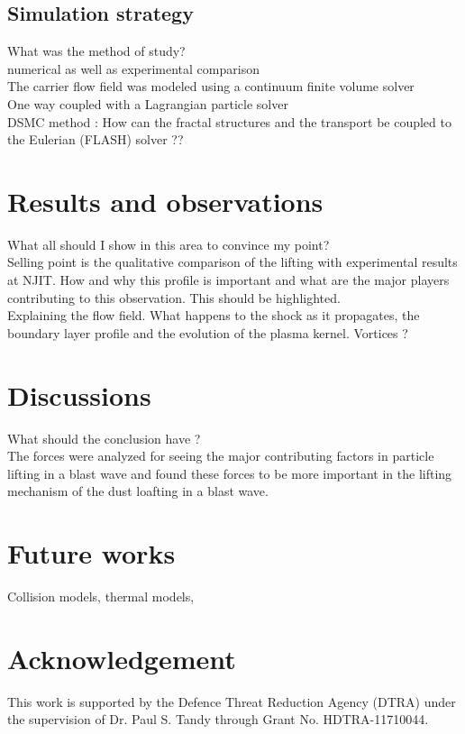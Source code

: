 \documentclass[12pt]{aiaa-tc}
\begin{document}
\subsection{Simulation strategy}
What was the method of study?\\
numerical as well as experimental comparison\\
The carrier flow field was modeled using a continuum finite volume solver\\
One way coupled with a Lagrangian particle solver\\

DSMC method : How can the fractal structures and the transport be coupled to the Eulerian (FLASH) solver ??\\


\newpage
\section{Results and observations}
What all should I show in this area to convince my point?\\
Selling point is the qualitative comparison of the lifting with experimental results at NJIT. How and why this profile is important and what are the major players contributing to this observation. This should be highlighted.\\

Explaining the flow field.
What happens to the shock as it propagates, the boundary layer profile and the evolution of the plasma kernel. Vortices ?


\newpage
\section{Discussions}
What should the conclusion have ?\\
The forces were analyzed for seeing the major contributing factors in particle lifting in a blast wave and found these forces to be more important in the lifting mechanism of the dust loafting in a blast wave.
\newpage
\section{Future works}
Collision models, thermal models, 
\newpage
\section{Acknowledgement}
This work is supported by the Defence Threat Reduction Agency (DTRA) under the supervision of Dr.  Paul S. Tandy through Grant No. HDTRA-11710044.

{}
\end{document}
